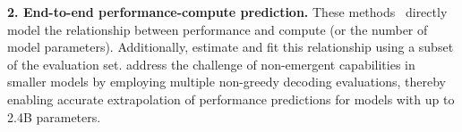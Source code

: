 \noindent\textbf{2. End-to-end performance-compute prediction.}
These methods~\cite{hu2023predicting, owen2024predictable, achiam2023gpt} directly model the relationship between performance and compute (or the number of model parameters). Additionally, \citet{achiam2023gpt} estimate and fit this relationship using a subset of the evaluation set. \citet{hu2023predicting} address the challenge of non-emergent capabilities in smaller models by employing multiple non-greedy decoding evaluations, thereby enabling accurate extrapolation of performance predictions for models with up to 2.4B parameters.










%
